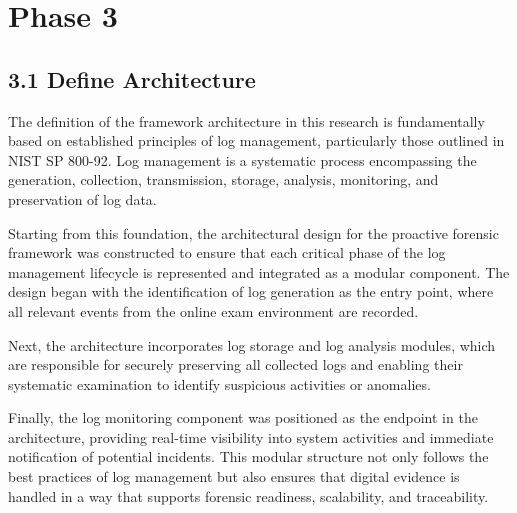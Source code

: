\section{Phase 3}
\subsection{3.1 Define Architecture}
The definition of the framework architecture in this research is fundamentally based on established principles of log management, particularly those outlined in NIST SP 800-92. Log management is a systematic process encompassing the generation, collection, transmission, storage, analysis, monitoring, and preservation of log data.

Starting from this foundation, the architectural design for the proactive forensic framework was constructed to ensure that each critical phase of the log management lifecycle is represented and integrated as a modular component. The design began with the identification of log generation as the entry point, where all relevant events from the online exam environment are recorded.

Next, the architecture incorporates log storage and log analysis modules, which are responsible for securely preserving all collected logs and enabling their systematic examination to identify suspicious activities or anomalies.

Finally, the log monitoring component was positioned as the endpoint in the architecture, providing real-time visibility into system activities and immediate notification of potential incidents. This modular structure not only follows the best practices of log management but also ensures that digital evidence is handled in a way that supports forensic readiness, scalability, and traceability.

